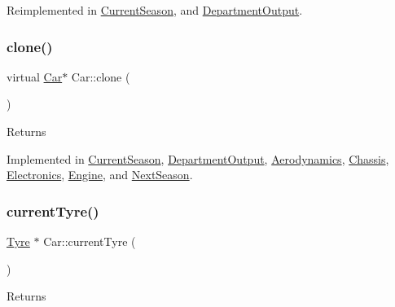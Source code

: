 Reimplemented in \hyperlink{classCurrentSeason_af605da3db8d851b07265951e5945669c}{Current\+Season}, and \hyperlink{classDepartmentOutput_a34d5c432ee7e7e8a33a4e8099a2c751f}{Department\+Output}.

\mbox{\label{classCar_a5a54bbfe8e72022f4d9fdf6ecc990d99}} 
\subsubsection{\texorpdfstring{clone()}{clone()}}
{\footnotesize\ttfamily virtual \hyperlink{classCar}{Car}$\ast$ Car\+::clone (\begin{DoxyParamCaption}{ }\end{DoxyParamCaption})\hspace{0.3cm}{\ttfamily [pure virtual]}}

\begin{DoxyReturn}{Returns}

\end{DoxyReturn}


Implemented in \hyperlink{classCurrentSeason_afaed34051750fdd603784e6ea7809075}{Current\+Season}, \hyperlink{classDepartmentOutput_ab20c9d559bca6ce8e6748dfac47c3f84}{Department\+Output}, \hyperlink{classAerodynamics_abbd7bb0e8186e3d86b8baf7a72aeb63e}{Aerodynamics}, \hyperlink{classChassis_a2700ee5437760643c7cad46e077dcbcd}{Chassis}, \hyperlink{classElectronics_a292164aedff12771f4f05af648a9fc70}{Electronics}, \hyperlink{classEngine_a18a3b9d950e67a868420b79890ba1428}{Engine}, and \hyperlink{classNextSeason_a79d36fb105db8d21293f905a7e3a78bd}{Next\+Season}.

\mbox{\label{classCar_aadd6f69cf389b293a5e8a098ebc75f1d}} 
\subsubsection{\texorpdfstring{current\+Tyre()}{currentTyre()}}
{\footnotesize\ttfamily \hyperlink{classTyre}{Tyre} $\ast$ Car\+::current\+Tyre (\begin{DoxyParamCaption}{ }\end{DoxyParamCaption})\hspace{0.3cm}{\ttfamily [virtual]}}

\begin{DoxyReturn}{Returns}

\end{DoxyReturn}


